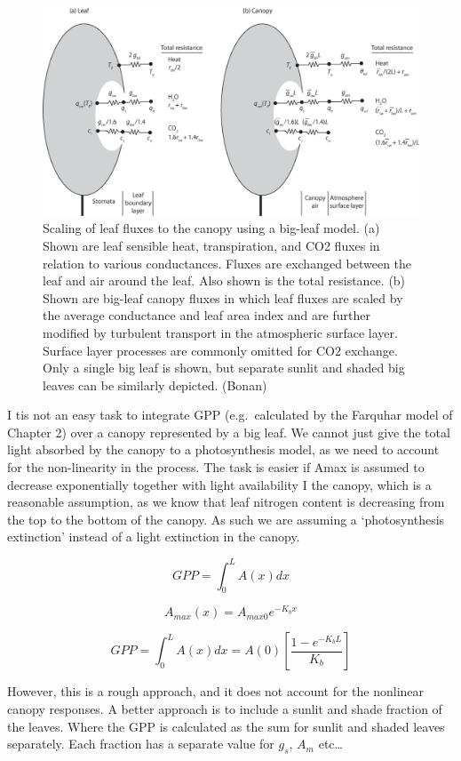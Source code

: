 \documentclass[12pt,oneside]{book}
\begin{document}
\begin{figure}

{\centering \includegraphics[width=0.8\linewidth]{figures/chap3/f323_bigleaf} 

}

\caption{Scaling of leaf fluxes to the canopy using a big-leaf model. (a) Shown are leaf sensible heat, transpiration, and CO2 fluxes in relation to various conductances. Fluxes are exchanged between the leaf and air around the leaf. Also shown is the total resistance. (b) Shown are big-leaf canopy fluxes in which leaf fluxes are scaled by the average conductance and leaf area index and are further modified by turbulent transport in the atmospheric surface layer. Surface layer processes are commonly omitted for CO2 exchange. Only a single big leaf is shown, but separate sunlit and shaded big leaves can be similarly depicted. (Bonan)}\label{fig:f323}
\end{figure}

I tis not an easy task to integrate GPP (e.g.~calculated by the Farquhar
model of Chapter 2) over a canopy represented by a big leaf. We cannot
just give the total light absorbed by the canopy to a photosynthesis
model, as we need to account for the non-linearity in the process. The
task is easier if Amax is assumed to decrease exponentially together
with light availability I the canopy, which is a reasonable assumption,
as we know that leaf nitrogen content is decreasing from the top to the
bottom of the canopy. As such we are assuming a `photosynthesis
extinction' instead of a light extinction in the canopy.

\[
GPP = \int_0^LA(x)dx
\]

\[
A_{max}(x) = A_{max0}e^{-K_bx}
\]

\[
GPP = \int_0^{L}A(x)dx = A(0) \left[\frac{1 - e^{-K_b L}}{K_b} \right]
\]

However, this is a rough approach, and it does not account for the
nonlinear canopy responses. A better approach is to include a sunlit and
shade fraction of the leaves. Where the GPP is calculated as the sum for
sunlit and shaded leaves separately. Each fraction has a separate value
for \(g_s\), \(A_m\) etc\ldots{}
\end{document}
